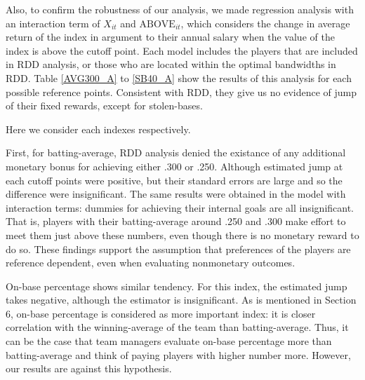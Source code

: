 \documentclass[dvipdfmx, 12pt]{article}
\begin{document}
Also, to confirm the robustness of our analysis, we made regression analysis with an interaction term of $X_{it}$ and $\text{ABOVE}_{it}$, which considers the change in average return of the index in argument to their annual salary when the value of the index is above the cutoff point. Each model includes the players that are included in RDD analysis, or those who are located within the optimal bandwidths in RDD. Table \ref{AVG300_A} to \ref{SB40_A} show the results of this analysis for each possible reference points. Consistent with RDD, they give us no evidence of jump of their fixed rewards, except for stolen-bases.




Here we consider each indexes respectively.

First, for batting-average, RDD analysis denied the existance of any additional monetary bonus for achieving either .300 or .250. Although estimated jump at each cutoff points were positive, but their standard errors are large and so the difference were insignificant. The same results were obtained in the model with interaction terms: dummies for achieving their internal goals are all insignificant. That is, players with their batting-average around .250 and .300 make effort to meet them just above these numbers, even though there is no monetary reward to do so. These findings support the assumption that preferences of the players are reference dependent, even when evaluating nonmonetary outcomes.

On-base percentage shows similar tendency. For this index, the estimated jump takes negative, although the estimator is insignificant. As is mentioned in Section 6, on-base percentage is considered as more important index: it is closer correlation with the winning-average of the team than batting-average. Thus, it can be the case that team managers evaluate on-base percentage more than batting-average and think of paying players with higher number more. However, our results are against this hypothesis.
\end{document}
